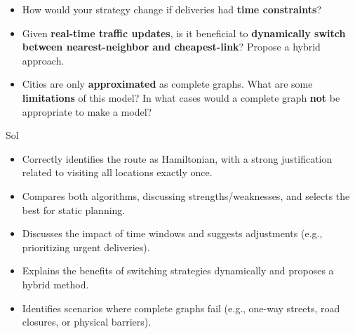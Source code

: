 \documentclass[12pt]{exam}
\begin{document}
\begin{enumerate}
\begin{itemize}
    \item How would your strategy change if deliveries had \textbf{time constraints}?
    \item Given \textbf{real-time traffic updates}, is it beneficial to \textbf{dynamically switch between nearest-neighbor and cheapest-link}? Propose a hybrid approach.
    \item Cities are only \textbf{approximated} as complete graphs. What are some \textbf{limitations} of this model? In what cases would a complete graph \textbf{not} be appropriate to make a model? 
\end{itemize}
\vfill
\newpage
Sol
\begin{itemize}
    \item Correctly identifies the route as Hamiltonian, with a strong justification related to visiting all locations exactly once. 
    \item Compares both algorithms, discussing strengths/weaknesses, and selects the best for static planning.
    \item Discusses the impact of time windows and suggests adjustments (e.g., prioritizing urgent deliveries). 
    \item Explains the benefits of switching strategies dynamically and proposes a hybrid method.
    \item Identifies scenarios where complete graphs fail (e.g., one-way streets, road closures, or physical barriers).
\end{itemize}
\end{enumerate}
\vfill
\end{document}
